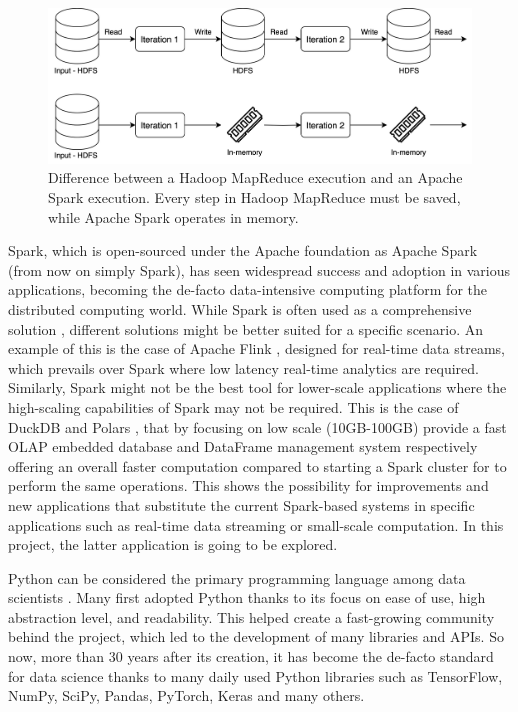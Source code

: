 \begin{figure}[!ht]
    \begin{center}
      \includegraphics[width=\textwidth]{figures/1-introduction/Spark_MapReduce.png}
    \end{center}
    \caption{Difference between a Hadoop MapReduce execution and an Apache Spark execution. Every step in Hadoop MapReduce must be saved, while Apache Spark operates in memory.}
    \label{fig:MapReducevsSpark}
\end{figure}


Spark, which is open-sourced under the Apache foundation as Apache Spark \cite{ApacheSparkUnified} (from now on simply Spark), has seen widespread success and adoption in various applications, becoming the de-facto data-intensive computing platform for the distributed computing world. While Spark is often used as a comprehensive solution \cite{zahariaApacheSparkUnified2016}, different solutions might be better suited for a specific scenario. An example of this is the case of Apache Flink \cite{carboneApacheFlinkStream}, designed for real-time data streams, which prevails over Spark where low latency real-time analytics are required. Similarly, Spark might not be the best tool for lower-scale applications where the high-scaling capabilities of Spark may not be required. This is the case of DuckDB \cite{raasveldtDuckDBEmbeddableAnalytical2019} and Polars \cite{vinkWroteOneFastest2021}, that by focusing on low scale (10GB-100GB) provide a fast \gls{OLAP} embedded database and DataFrame management system respectively offering an overall faster computation compared to starting a Spark cluster for to perform the same operations. This shows the possibility for improvements and new applications that substitute the current Spark-based systems in specific applications such as real-time data streaming or small-scale computation. In this project, the latter application is going to be explored.

Python can be considered the primary programming language among data scientists \cite{Python_CS-R9526}. Many first adopted Python thanks to its focus on ease of use, high abstraction level, and readability. This helped create a fast-growing community behind the project, which led to the development of many libraries and \glspl{API}. So now, more than 30 years after its creation, it has become the de-facto standard for data science thanks to many daily used Python libraries such as TensorFlow, NumPy, SciPy, Pandas, PyTorch, Keras and many others.


